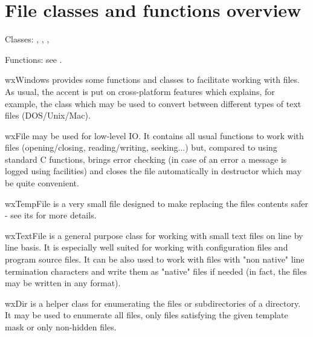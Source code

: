 \section{File classes and functions overview}\label{wxfileoverview}

Classes: , , , 

Functions: see .

wxWindows provides some functions and classes to facilitate working with files.
As usual, the accent is put on cross-platform features which explains, for
example, the  class which may be used to convert
between different types of text files (DOS/Unix/Mac).

wxFile may be used for low-level IO. It contains all usual functions to work
with files (opening/closing, reading/writing, seeking...) but, compared to
using standard C functions, brings error checking (in case of an error a message
is logged using  facilities) and closes the file
automatically in destructor which may be quite convenient.

wxTempFile is a very small file designed to make replacing the files contents
safer - see its  for more details.

wxTextFile is a general purpose class for working with small text files on line
by line basis. It is especially well suited for working with configuration files
and program source files. It can be also used to work with files with "non
native" line termination characters and write them as "native" files if needed
(in fact, the files may be written in any format).

wxDir is a helper class for enumerating the files or subdirectories of a
directory. It may be used to enumerate all files, only files satisfying the
given template mask or only non-hidden files.
